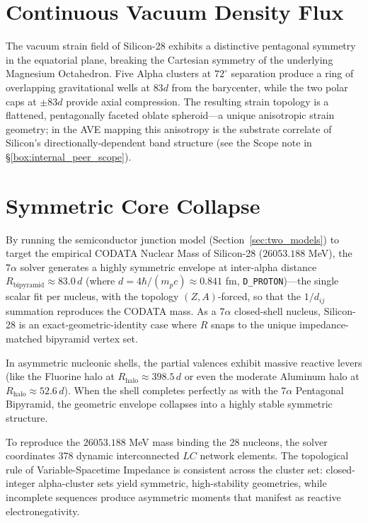 \section{Continuous Vacuum Density Flux}
The vacuum strain field of Silicon-28 exhibits a distinctive pentagonal symmetry in the equatorial plane, breaking the Cartesian symmetry of the underlying Magnesium Octahedron. Five Alpha clusters at $72^\circ$ separation produce a ring of overlapping gravitational wells at $83d$ from the barycenter, while the two polar caps at $\pm 83d$ provide axial compression. The resulting strain topology is a flattened, pentagonally faceted oblate spheroid---a unique anisotropic strain geometry; in the AVE mapping this anisotropy is the substrate correlate of Silicon's directionally-dependent band structure (see the Scope note in \S\ref{box:internal_peer_scope}).

\section{Symmetric Core Collapse}
By running the semiconductor junction model (Section~\ref{sec:two_models}) to target the empirical CODATA Nuclear Mass of Silicon-28 ($26053.188$ MeV), the $7\alpha$ solver generates a highly symmetric envelope at inter-alpha distance $R_{\text{bipyramid}} \approx 83.0\,d$ (where $d = 4\hbar/(m_p c) \approx 0.841$ fm, \texttt{D\_PROTON})---the single scalar fit per nucleus, with the topology $(Z,A)$-forced, so that the $1/d_{ij}$ summation reproduces the CODATA mass. As a $7\alpha$ closed-shell nucleus, Silicon-28 is an exact-geometric-identity case where $R$ snaps to the unique impedance-matched bipyramid vertex set.

In asymmetric nucleonic shells, the partial valences exhibit massive reactive levers (like the Fluorine halo at $R_{\text{halo}} \approx 398.5\,d$ or even the moderate Aluminum halo at $R_{\text{halo}} \approx 52.6\,d$). When the shell completes perfectly as with the $7\alpha$ Pentagonal Bipyramid, the geometric envelope collapses into a highly stable symmetric structure.

To reproduce the $26053.188$ MeV mass binding the 28 nucleons, the solver coordinates 378 dynamic interconnected $LC$ network elements. The topological rule of Variable-Spacetime Impedance is consistent across the cluster set: closed-integer alpha-cluster sets yield symmetric, high-stability geometries, while incomplete sequences produce asymmetric moments that manifest as reactive electronegativity.

